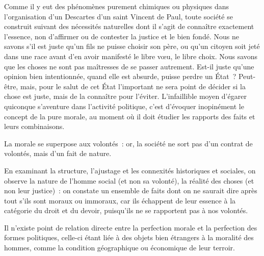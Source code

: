 \documentclass[french,twoside]{book} %
\newcommand{\astermono}{\medskip\centerline{\color{rubric}\large\selectfont{\syms ✻}}\medskip\par}%
\begin{document}
\noindent Comme il y eut des phénomènes purement chimiques ou physiques dans l’organisation d’un Descartes d’un saint Vincent de Paul, toute société se construit suivant des nécessités naturelles dont il s’agit de connaître exactement l’essence, non d’affirmer ou de contester la justice et le bien fondé. Nous ne savons s’il est juste qu’un fils ne puisse choisir son père, ou qu’un citoyen soit jeté dans une race avant d’en avoir manifesté le libre vœu, le libre choix. Nous savons que les choses ne sont pas maîtresses de se passer autrement. Est-il juste qu’une opinion bien intentionnée, quand elle est absurde, puisse perdre un État ? Peut-être, mais, pour le salut de cet État l’important ne sera point de décider si la chose est juste, mais de la connaître pour l’éviter. L’infaillible moyen d’égarer quiconque s’aventure dans l’activité politique, c’est d’évoquer inopinément le concept de la pure morale, au moment où il doit étudier les rapports des faits et leurs combinaisons.\par
La morale se superpose aux volontés : or, la société ne sort pas d’un contrat de volontés, mais d’un fait de nature.\par

\astermono

\noindent En examinant la structure, l’ajustage et les connexités historiques et sociales, on observe la nature de l’homme social (et non sa volonté), la réalité des choses (et non leur justice) : on constate un ensemble de faits dont on ne saurait dire après tout s’ils sont moraux ou immoraux, car ils échappent de leur essence à la catégorie du droit et du devoir, puisqu’ils ne se rapportent pas à nos volontés.\par

\astermono

\noindent Il n’existe point de relation directe entre la perfection morale et la perfection des formes politiques, celle-ci étant liée à des objets bien étrangers à la moralité des hommes, comme la condition géographique ou économique de leur terroir.\par

\astermono
\end{document}
